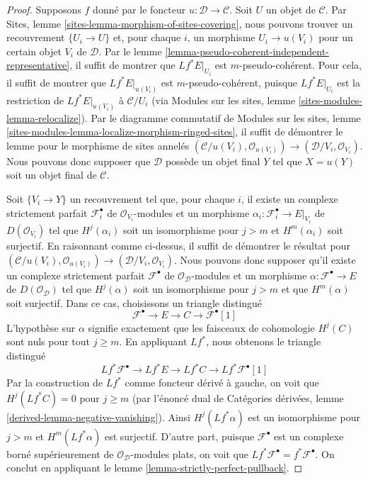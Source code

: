 \begin{proof}
Supposons $f$ donné par le foncteur $u : \mathcal{D} \to \mathcal{C}$.
Soit $U$ un objet de $\mathcal{C}$. Par Sites, lemme
\ref{sites-lemma-morphism-of-sites-covering}, nous pouvons trouver un
recouvrement $\{U_i \to U\}$ et, pour chaque $i$, un morphisme
$U_i \to u(V_i)$ pour un certain objet $V_i$ de $\mathcal{D}$.
Par le lemme \ref{lemma-pseudo-coherent-independent-representative},
il suffit de montrer que $Lf^*E|_{U_i}$ est $m$-pseudo-cohérent.
Pour cela, il suffit de montrer que $Lf^*E|_{u(V_i)}$ est
$m$-pseudo-cohérent, puisque $Lf^*E|_{U_i}$ est la restriction de
$Lf^*E|_{u(V_i)}$ à $\mathcal{C}/U_i$ (via Modules sur les sites, lemme
\ref{sites-modules-lemma-relocalize}).
Par le diagramme commutatif de Modules sur les sites, lemme
\ref{sites-modules-lemma-localize-morphism-ringed-sites}, il suffit de
démontrer le lemme pour le morphisme de sites annelés
$(\mathcal{C}/u(V_i), \mathcal{O}_{u(V_i)}) \to
(\mathcal{D}/V_i, \mathcal{O}_{V_i})$.
Nous pouvons donc supposer que $\mathcal{D}$ possède un objet final $Y$ tel
que $X = u(Y)$ soit un objet final de $\mathcal{C}$.

\medskip\noindent
Soit $\{V_i \to Y\}$ un recouvrement tel que, pour chaque $i$, il existe
un complexe strictement parfait $\mathcal{F}_i^\bullet$ de
$\mathcal{O}_{V_i}$-modules et un morphisme
$\alpha_i : \mathcal{F}_i^\bullet \to E|_{V_i}$ de $D(\mathcal{O}_{V_i})$
tel que $H^j(\alpha_i)$ soit un isomorphisme pour $j > m$ et
$H^m(\alpha_i)$ soit surjectif. En raisonnant comme ci-dessus, il suffit de
démontrer le résultat pour
$(\mathcal{C}/u(V_i), \mathcal{O}_{u(V_i)}) \to
(\mathcal{D}/V_i, \mathcal{O}_{V_i})$. Nous pouvons donc supposer qu'il
existe un complexe strictement parfait $\mathcal{F}^\bullet$ de
$\mathcal{O}_\mathcal{D}$-modules et un morphisme
$\alpha : \mathcal{F}^\bullet \to E$ de $D(\mathcal{O}_\mathcal{D})$ tel
que $H^j(\alpha)$ soit un isomorphisme pour $j > m$ et que
$H^m(\alpha)$ soit surjectif. Dans ce cas, choisissons un triangle distingué
$$
\mathcal{F}^\bullet \to E \to C \to \mathcal{F}^\bullet[1]
$$
L'hypothèse sur $\alpha$ signifie exactement que les faisceaux de cohomologie
$H^j(C)$ sont nuls pour tout $j \geq m$. En appliquant $Lf^*$, nous obtenons
le triangle distingué
$$
Lf^*\mathcal{F}^\bullet \to Lf^*E \to Lf^*C \to Lf^*\mathcal{F}^\bullet[1]
$$
Par la construction de $Lf^*$ comme foncteur dérivé à gauche, on voit que
$H^j(Lf^*C) = 0$ pour $j \geq m$ (par l'énoncé dual de Catégories dérivées,
lemme \ref{derived-lemma-negative-vanishing}). Ainsi $H^j(Lf^*\alpha)$ est
un isomorphisme pour $j > m$ et $H^m(Lf^*\alpha)$ est surjectif.
D'autre part, puisque $\mathcal{F}^\bullet$ est un complexe borné supérieurement
de $\mathcal{O}_\mathcal{D}$-modules plats, on voit que
$Lf^*\mathcal{F}^\bullet = f^*\mathcal{F}^\bullet$.
On conclut en appliquant le lemme \ref{lemma-strictly-perfect-pullback}.
\end{proof}

